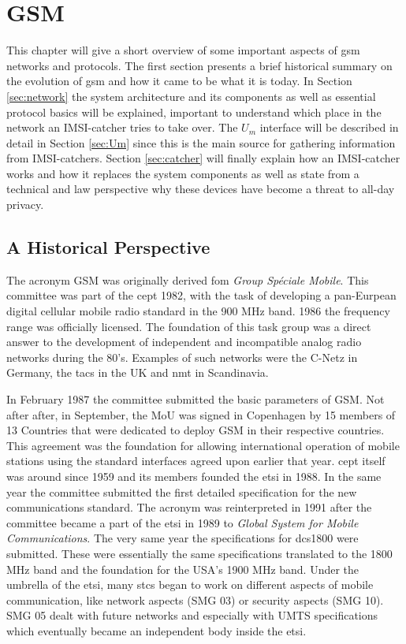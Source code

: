 \chapter{GSM}
\label{ch:gsm}
This chapter will give a short overview of some important aspects of \gls{gsm} networks and protocols.
The first section presents a brief historical summary on the evolution of \gls{gsm} and how it came to be what it is today.
In Section \ref{sec:network} the system architecture and its components as well as essential protocol basics will be explained, important to understand which place in the network an IMSI-catcher tries to take over.
The $U_m$ interface will be described in detail in Section \ref{sec:Um} since this is the main source for gathering information from IMSI-catchers.
Section \ref{sec:catcher} will finally explain how an IMSI-catcher works and how it replaces the system components as well as state from a technical and law perspective why these devices have become a threat to all-day privacy. 
 
\section{A Historical Perspective}
The acronym GSM was originally derived fom \emph{Group Sp\'{e}ciale Mobile}.
This committee was part of the \gls{cept} 1982, with the task of developing a pan-Eurpean digital cellular mobile radio standard in the 900 MHz band.
1986 the frequency range was officially licensed.
The foundation of this task group was a direct answer to the development of independent and incompatible analog radio networks during the 80's.
Examples of such networks were the C-Netz in Germany, the \gls{tacs} in the UK and \gls{nmt} in Scandinavia.

In February 1987 the committee submitted the basic parameters of GSM. 
Not after after, in September, the \gls{MoU} was signed in Copenhagen by 15 members of 13 Countries that were dedicated to deploy GSM in their respective countries.
This agreement was the foundation for allowing international operation of mobile stations using the standard interfaces agreed upon earlier that year.
\gls{cept} itself was around since 1959 and its members founded the \gls{etsi} in 1988.
In the same year the committee submitted the first detailed specification for the new communications standard.
The acronym was reinterpreted in 1991 after the committee became a part of the \gls{etsi} in 1989 to \emph{Global System for Mobile Communications}.
The very same year the specifications for \gls{dcs1800} were submitted.
These were essentially the same specifications translated to the 1800 MHz band and the foundation for the USA's 1900 MHz band.
Under the umbrella of the \gls{etsi}, many \glspl{stc} began to work on different aspects of mobile communication, like network aspects (SMG 03) or security aspects (SMG 10).
SMG 05 dealt with future networks and especially with UMTS specifications which eventually became an independent body inside the \gls{etsi}.

